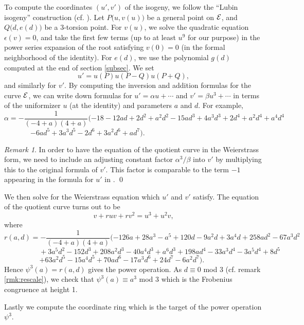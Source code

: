 \documentclass{gtpart}
\theoremstyle{definition}
\theoremstyle{remark}
\newtheorem{rmk}[thm]{Remark}
\begin{document}
To compute the coordinates $(u',v')$ of the isogeny, we follow the ``Lubin 
isogeny'' construction (cf. \cite[proof of theorem 1.4]{lubin}).  Let 
$P\big(u,v(u)\big)$ be a general point on $\cal E$, and $Q\big(d,e(d)\big)$ be 
a 3-torsion point.  For $v(u)$, we solve the quadratic equation 
$\epsilon(v) = 0$, and take the first few terms (up to at least $u^9$ for our 
purpose) in the power series expansion of the root satisfying $v(0)=0$ (in the 
formal neighborhood of the identity).  For $e(d)$, we use the polynomial 
$g(d)$ computed at the end of section \ref{subsec}.  We set 
\[
 u' = u(P) u(P-Q) u(P+Q), 
\]
and similarly for $v'$.  By computing the inversion and addition formulas for 
the curve $\cal E$, we can write down formulas for $u' = \alpha u + \cdots$ 
and $v' = \beta u^3 + \cdots$ in terms of the uniformizer $u$ (at the 
identity) and parameters $a$ and $d$.  For example, 
\[
 \alpha = -\frac{1}{(-4 + a) (4 + a)}(-18 - 12 a d + 2 d^2 + a^2 d^2 
 - 15 a d^3 + 4 a^3 d^3 + 2 d^4 + a^2 d^4 + a^4 d^4 
\]
\[
 - 6 a d^5 + 3 a^3 d^5 - 2 d^6 + 3 a^2 d^6 + a d^7).  
 ~~~~~~~~~~~~~~~~~~~~~~~~~~~~~~~~~~~~~~~~~~~~~~~~~~~~~~~~~~ 
\]
\begin{rmk}
 In order to have the equation of the quotient curve in the Weierstrass form, 
 we need to include an adjusting constant factor $\alpha^3 / \beta$ into $v'$ 
 by multiplying this to the original formula of $v'$.  This factor is 
 comparable to the term $-1$ appearing in the formula for $u'$ in 
 \cite[p.~6]{h2p2}.  \qed
\end{rmk}

We then solve for the Weierstrass equation which $u'$ and $v'$ satisfy.  The 
equation of the quotient curve turns out to be 
\[
 v + r u v + r v^2 = u^3 + u^2 v, 
\]
where 
\[
 r(a,d) = -\frac{1}{(-4 + a) (4 + a)}(-126 a + 28 a^3 - a^5 + 120 d - 9 a^2 d 
 + 3 a^4 d + 258 a d^2 - 67 a^3 d^2 
\]
\[
 ~~~~~~~~~~~~~~~~~~~~~~+ 3 a^5 d^2 - 152 d^3 + 208 a^2 d^3 - 40 a^4 d^3 + 
 a^6 d^3 + 198 a d^4 - 33 a^3 d^4 - 3 a^5 d^4 + 8 d^5 
\]
\[
 + 63 a^2 d^5 - 15 a^4 d^5 + 70 a d^6 - 17 a^3 d^6 + 24 d^7 - 6 a^2 d^7).  
 ~~~~~~~~~~~~~~~ 
\]
Hence $\psi^3(a) = r(a,d)$ gives the power operation.  As $d \equiv 0$ mod 3 
(cf. remark \ref{rmk:rescale}), we check that $\psi^3(a) \equiv a^3$ mod 3 
which is the Frobenius congruence at height 1.  

Lastly we compute the coordinate ring which is the target of the power 
operation $\psi^3$.  
\end{document}
